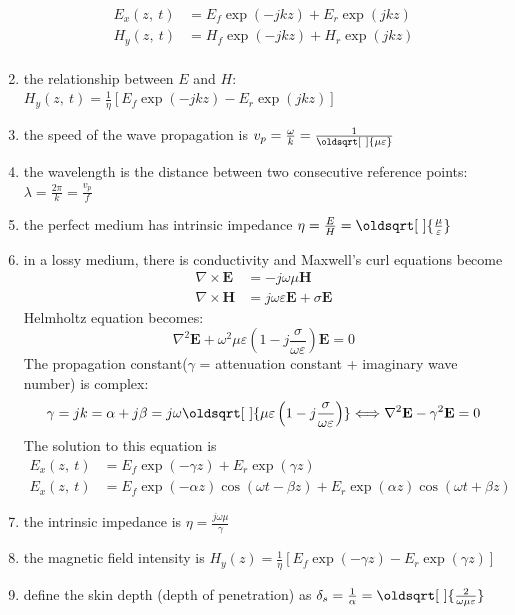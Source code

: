 \documentclass[a4paper,11pt]{article}
\renewcommand*{\sqrt}[2][\ ]{\oldsqrt[#1]{#2}}
\newcommand{\grad}{\nabla}
\newcommand{\curl}{\nabla \times}
\newcommand{\bvec}[1]{\mathbf{#1}}
\begin{document}
\begin{enumerate}
		\begin{align*}
			E_x(z,~t) &= E_f\exp\left(-jkz\right) + E_r\exp\left(jkz\right) \\
			H_y(z,~t) &= H_f\exp\left(-jkz\right) + H_r\exp\left(jkz\right) \\
		\end{align*}
		\item the relationship between $E$ and $H$: $H_y(z,~t) = \frac{1}{\eta}\left[E_f\exp\left(-jkz\right) - E_r\exp\left(jkz\right)\right]$
		\item the speed of the wave propagation is $v_p = \frac{\omega}{k} = \frac{1}{\sqrt{\mu\varepsilon}}$
		\item the wavelength is the distance between two consecutive reference points: $\lambda = \frac{2\pi}{k} = \frac{v_p}{f}$
		\item the perfect medium has intrinsic impedance $\eta = \frac{E}{H} = \sqrt{\frac{\mu}{\varepsilon}}$
		\item in a lossy medium, there is conductivity and Maxwell's curl equations become
		\begin{align*}
			\curl\bvec{E} &= -j\omega\mu\bvec{H} \\ 
			\curl\bvec{H} &= j\omega\varepsilon\bvec{E} + \sigma\bvec{E} 
		\end{align*}
		Helmholtz equation becomes: $$\grad^2\bvec{E} + \omega^2\mu\varepsilon\left(1 - j\frac{\sigma}{\omega\varepsilon}\right)\bvec{E} = 0 $$
		The propagation constant($\gamma$ = attenuation constant + imaginary wave number) is complex: $$\gamma = jk = \alpha + j\beta= j\omega\sqrt{\mu\varepsilon\left(1 - j\frac{\sigma}{\omega\varepsilon}\right)} \Longleftrightarrow \grad^2\bvec{E} - \gamma^2\bvec{E} = 0$$
		The solution to this equation is 
		\begin{align*}
			E_x(z,~t) &= E_f\exp\left(-\gamma z\right) + E_r\exp\left(\gamma z\right) \\
			E_x(z,~t) &= E_f\exp\left(-\alpha z\right)\cos\left(\omega t - \beta z\right) + E_r\exp\left(\alpha z\right)\cos\left(\omega t + \beta z\right)
		\end{align*} 
		\item the intrinsic impedance is $\eta = \frac{j\omega\mu}{\gamma}$
		\item the magnetic field intensity is $H_y(z) = \frac{1}{\eta}\left[E_f\exp\left(-\gamma z\right) - E_r\exp\left(\gamma z\right)\right]$
		\item define the skin depth (depth of penetration) as $\delta_s = \frac{1}{\alpha} = \sqrt{\frac{2}{\omega\mu\varepsilon}}$

\end{enumerate}
\end{document}

